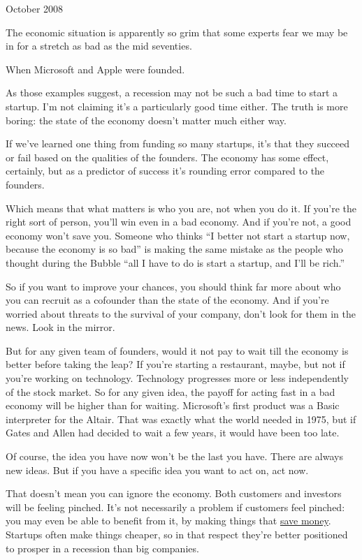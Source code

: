 October 2008

The economic situation is apparently so grim that some experts fear we
may be in for a stretch as bad as the mid seventies.

When Microsoft and Apple were founded.

As those examples suggest, a recession may not be such a bad time to
start a startup. I'm not claiming it's a particularly good time either.
The truth is more boring: the state of the economy doesn't matter much
either way.

If we've learned one thing from funding so many startups, it's that they
succeed or fail based on the qualities of the founders. The economy has
some effect, certainly, but as a predictor of success it's rounding
error compared to the founders.

Which means that what matters is who you are, not when you do it. If
you're the right sort of person, you'll win even in a bad economy. And
if you're not, a good economy won't save you. Someone who thinks ``I
better not start a startup now, because the economy is so bad'' is
making the same mistake as the people who thought during the Bubble
``all I have to do is start a startup, and I'll be rich.''

So if you want to improve your chances, you should think far more about
who you can recruit as a cofounder than the state of the economy. And if
you're worried about threats to the survival of your company, don't look
for them in the news. Look in the mirror.

But for any given team of founders, would it not pay to wait till the
economy is better before taking the leap? If you're starting a
restaurant, maybe, but not if you're working on technology. Technology
progresses more or less independently of the stock market. So for any
given idea, the payoff for acting fast in a bad economy will be higher
than for waiting. Microsoft's first product was a Basic interpreter for
the Altair. That was exactly what the world needed in 1975, but if Gates
and Allen had decided to wait a few years, it would have been too late.

Of course, the idea you have now won't be the last you have. There are
always new ideas. But if you have a specific idea you want to act on,
act now.

That doesn't mean you can ignore the economy. Both customers and
investors will be feeling pinched. It's not necessarily a problem if
customers feel pinched: you may even be able to benefit from it, by
making things that \href{http://bountii.com}{save money}. Startups often
make things cheaper, so in that respect they're better positioned to
prosper in a recession than big companies.

